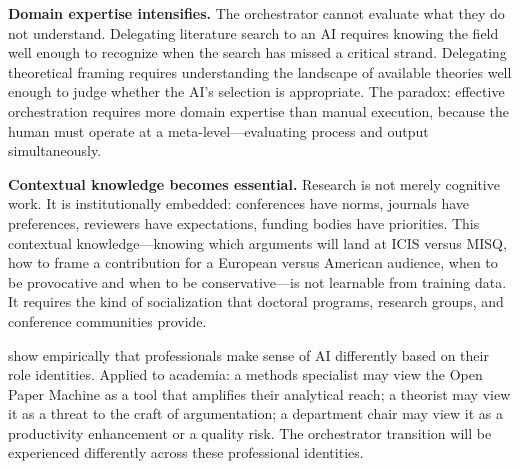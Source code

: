 \documentclass{article}
\begin{document}
\textbf{Domain expertise intensifies.} The orchestrator cannot evaluate what they do not understand. Delegating literature search to an AI requires knowing the field well enough to recognize when the search has missed a critical strand. Delegating theoretical framing requires understanding the landscape of available theories well enough to judge whether the AI's selection is appropriate. The paradox: effective orchestration requires more domain expertise than manual execution, because the human must operate at a meta-level---evaluating process and output simultaneously.

\textbf{Contextual knowledge becomes essential.} Research is not merely cognitive work. It is institutionally embedded: conferences have norms, journals have preferences, reviewers have expectations, funding bodies have priorities. This contextual knowledge---knowing which arguments will land at ICIS versus MISQ, how to frame a contribution for a European versus American audience, when to be provocative and when to be conservative---is not learnable from training data. It requires the kind of socialization that doctoral programs, research groups, and conference communities provide.

\citet{scarbrough2024epistemic} show empirically that professionals make sense of AI differently based on their role identities. Applied to academia: a methods specialist may view the Open Paper Machine as a tool that amplifies their analytical reach; a theorist may view it as a threat to the craft of argumentation; a department chair may view it as a productivity enhancement or a quality risk. The orchestrator transition will be experienced differently across these professional identities.





\end{document}
